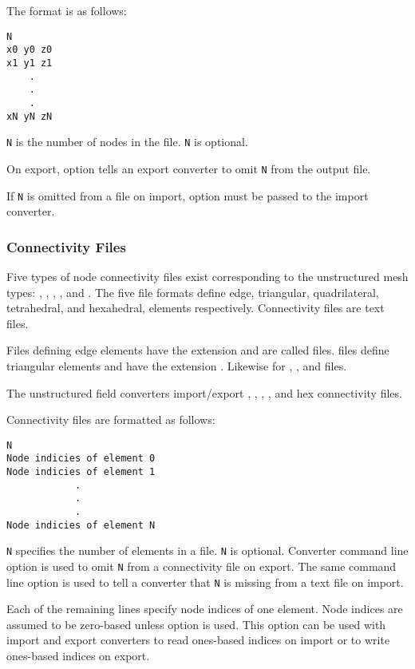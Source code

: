 The format is as follows:

\begin{verbatim}
N
x0 y0 z0
x1 y1 z1
    .
    .
    .
xN yN zN
\end{verbatim}

\verb|N| is the number of nodes in the file.  \verb|N| is optional.

On export, option  tells an export converter to
omit \verb|N| from the output file.

If \verb|N| is omitted from a file on import, option
 must be passed to the import converter.


\subsubsection{Connectivity Files}
\label{sec:node_conn_fmt}

Five types of node connectivity files exist corresponding to the
unstructured mesh types: , ,
, , and
.  The five file formats define
edge, triangular, quadrilateral, tetrahedral, and hexahedral,
elements respectively.  Connectivity files are text files.

Files defining edge elements have the extension  and
are called  files.   files define triangular
elements and have the extension .  Likewise for
, , and  files.

The unstructured field converters import/export ,
, , , and hex connectivity
files.

Connectivity files are formatted as follows:

\begin{verbatim}
N
Node indicies of element 0
Node indicies of element 1
            .
            .
            .
Node indicies of element N
\end{verbatim}

\verb|N| specifies the number of elements in a file.  \verb|N| is
optional.  Converter command line option  is
used to omit \verb|N| from a connectivity file on export.  The same
command line option is used to tell a converter that \verb|N| is
missing from a text file on import.

Each of the remaining lines specify node indices of one element.
Node indices are assumed to be zero-based unless option
 is used.  This option can be used with
import and export converters to read ones-based indices on
import or to write ones-based indices on export.

